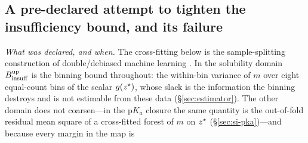 \subsection{A pre-declared attempt to tighten the insufficiency bound, and its failure}
\label{sec:si-crossfit}

\emph{What was declared, and when.} The cross-fitting below is the sample-splitting
construction of double/debiased machine learning \cite{chernozhukov2018dml}. In the solubility domain $B_{\mathrm{insuff}}^{\mathrm{up}}$ is the
binning bound throughout: the within-bin variance of $m$ over eight equal-count bins of the scalar
$g(z^\star)$, whose slack is the information the binning destroys and is not estimable from these
data (\S\ref{sec:estimator}). The other domain does not coarsen---in the $\mathrm pK_a$ closure the same
quantity is the out-of-fold residual mean square of a cross-fitted forest of $m$ on $z^\star$
(\S\ref{sec:si-pka})---and because every margin in the map is


